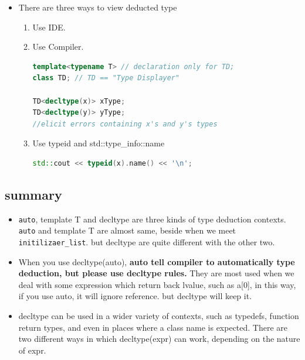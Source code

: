 \documentclass[a4paper,11pt,twoside]{book}
\begin{document}
\begin{itemize}
	\item There are three ways to view deducted type
	\begin{enumerate}
		\item Use IDE.
		\item Use Compiler.
\begin{lstlisting}[frame=single, language=c++]
template<typename T> // declaration only for TD;
class TD; // TD == "Type Displayer"

TD<decltype(x)> xType; 
TD<decltype(y)> yType; 
//elicit errors containing x's and y's types
\end{lstlisting}

	\item Use typeid and std::type\_info::name
	
\begin{lstlisting}[frame=single, language=c++]
std::cout << typeid(x).name() << '\n'; 
\end{lstlisting}
		
	\end{enumerate}
	
\end{itemize}

\subsection{summary}
\begin{itemize}
	\item \texttt{auto}, template T and decltype are three kinds of type deduction contexts. \texttt{auto} and template T are almost same, beside when we meet \texttt{initilizaer\_list}. but decltype are quite different with the other two. 
	
	\item When you use decltype(auto), \textbf{auto tell compiler to automatically type deduction, but please use decltype rules.} They are most used when we deal with some expression which return back lvalue, such as a[0], in this way, if you use auto, it will ignore reference. but decltype will keep it. 
	
	\item decltype can be used in a wider variety of contexts, such as typedefs, function return types, and even in places where a class name is expected. There are two different ways in which decltype(expr) can work, depending on the nature of expr.
	
	

\end{itemize}
\end{document}

